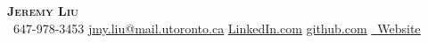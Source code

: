 \begin{center}
    \textbf{\Huge \scshape Jeremy Liu} \\ \vspace{1pt}
     \ \small 647-978-3453 \quad
    \href{mailto:jmy.liu@mail.utoronto.ca}{ \underline{jmy.liu@mail.utoronto.ca}} \quad
    \href{https://www.linkedin.com/in/jmyl}{ \underline{LinkedIn.com}} \quad
    \href{https://github.com/jeremyliu-621}{ \underline{github.com}} \quad
    \href{https://jeremyliu.vercel.app/}{\faGlobe\ 
    \underline{Website}}

\end{center}